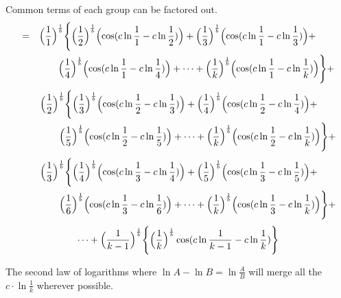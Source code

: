 \documentclass{amsart}
\begin{document}
	Common terms of each group can be factored out.
	\[
	\begin{aligned}
		= \quad & \Bigl( \frac{1}{1} \Bigr)^\frac1b \Biggl\{ \Bigl( \frac{1}{2} \Bigr)^\frac1b \Bigl( \cos(c \ln \frac{1}{1} - c \ln \frac{1}{2}) \Bigr) + \Bigl( \frac{1}{3} \Bigr)^\frac1b \Bigl( \cos(c \ln \frac{1}{1} - c \ln \frac{1}{3}) \Bigr) + \\
		& \qquad \Bigl( \frac{1}{4} \Bigr)^\frac1b \Bigl( \cos(c \ln \frac{1}{1} - c \ln \frac{1}{4}) \Bigr) + \dots  + \Bigl( \frac{1}{k} \Bigr)^\frac1b \Bigl( \cos(c \ln \frac{1}{1} - c \ln \frac{1}{k}) \Bigr) \Biggr\} + 
	\end{aligned}
	\]
	\[
	\begin{aligned}
		\quad\quad & \Bigl( \frac{1}{2}  \Bigr)^\frac1b \Biggl\{ \Bigl( \frac{1}{3} \Bigr)^\frac1b \Bigl( \cos(c \ln \frac{1}{2} - c \ln \frac{1}{3}) \Bigr) + \Bigl( \frac{1}{4} \Bigr)^\frac1b \Bigl( \cos(c \ln \frac{1}{2} - c \ln \frac{1}{4}) \Bigr) + \\
		& \qquad \Bigl( \frac{1}{5} \Bigr)^\frac1b \Bigl( \cos(c \ln \frac{1}{2} - c \ln \frac{1}{5}) \Bigr) + \dots  + \Bigl( \frac{1}{k} \Bigr)^\frac1b \Bigl( \cos(c \ln \frac{1}{2} - c \ln \frac{1}{k}) \Bigr) \Biggr\} + 
	\end{aligned}
	\]
	\[
	\begin{aligned}
		\quad\quad & \Bigl( \frac{1}{3} \Bigr)^\frac1b \Biggl\{ \Bigl( \frac{1}{4} \Bigr)^\frac1b \Bigl( \cos(c \ln \frac{1}{3} - c \ln \frac{1}{4}) \Bigr) + \Bigl( \frac{1}{5} \Bigr)^\frac1b \Bigl( \cos(c \ln \frac{1}{3} - c \ln \frac{1}{5}) \Bigr) + \\
		& \qquad \Bigl( \frac{1}{6} \Bigr)^\frac1b \Bigl( \cos(c \ln \frac{1}{3} - c \ln \frac{1}{6}) \Bigr) + \dots  + \Bigl( \frac{1}{k} \Bigr)^\frac1b \Bigl( \cos(c \ln \frac{1}{3} - c \ln \frac{1}{k}) \Bigr) \Biggr\} + 
	\end{aligned}
	\]
	\[ \dots + \Bigl( \frac{1}{k-1} \Bigr)^\frac1b \Biggl\{ \Bigl( \frac{1}{k} \Bigr)^\frac1b \cos(c \ln \frac{1}{k-1} - c \ln \frac{1}{k}) \Biggr\} \]
	
	
	The second law of logarithms where $ \ln{A} - \ln{B} = \ln{\frac{A}{B}} $ will merge all the $c \cdot \ln \frac{1}{k}$ wherever possible.
	
\end{document}
